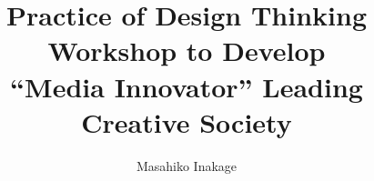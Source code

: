 \documentclass[12pt,a4paper]{report}	%
\title{Practice of Design Thinking Workshop to Develop\\
  ``Media Innovator'' Leading Creative Society}
\author{Masahiko Inakage}
\begin{document}
\def\chaptermark#1{\markboth{#1}{ }}%
%
%
\titlepage
\comemberspage
\firstabstract
%
%
\toc
\ifPROPOSAL
\else
   \newpage
   \listoffigures
   \listoftables
   \acknowledgements
   \acknowledgementstext
\fi

\newpage
{}
\def\chaptermark#1{\markboth{\thechapter.\ #1}{ }}%

%
%


%
%
%
%
%
%
%
\def\chaptermark#1{\markboth{#1}{ }}%


\newpage


%
%

%
%



%
\ifCHICAGO
   
\else
   
\fi
%
%
%
\appendix
\def\chaptermark#1{\markboth{\thechapter.\ #1}{ }}%
%

%
\end{document}
